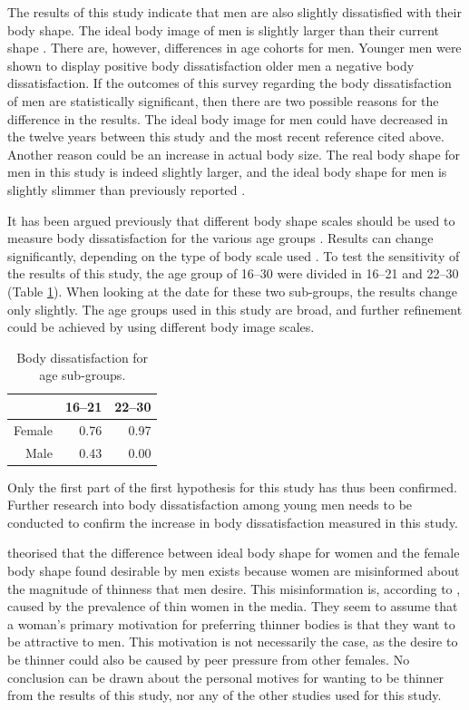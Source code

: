 \documentclass[a4paper, jou]{apa6}
\begin{document}
The results of this study indicate that men are also slightly dissatisfied with their body shape. The ideal body image of men is slightly larger than their current shape \cite{fallon_sex_1985,tiggeman_body-size_1992}. There are, however, differences in age cohorts for men. Younger men were shown to display positive body dissatisfaction older men a negative body dissatisfaction. If the outcomes of this survey regarding the body dissatisfaction of men are statistically significant, then there are two possible reasons for the difference in the results. The ideal body image for men could have decreased in the twelve years between this study and the most recent reference cited above. Another reason could be an increase in actual body size. The real body shape for men in this study is indeed slightly larger, and the ideal body shape for men is slightly slimmer than previously reported \cite{lamb_body_1993}.

It has been argued previously that different body shape scales should be used to measure body dissatisfaction for the various age groups \cite{byrne_should_1996}. Results can change significantly, depending on the type of body scale used \cite{tiggeman_body-size_1992}. To test the sensitivity of the results of this study, the age group of 16--30 were divided in 16--21 and 22--30 (Table \ref{age2}). When looking at the date for these two sub-groups, the results change only slightly. The age groups used in this study are broad, and further refinement could be achieved by using different body image scales.


\begin{table}[ht]
\centering
\begin{tabular}{rrr}
  \hline
 & 16--21 & 22--30 \\ 
  \hline
Female & 0.76 & 0.97 \\ 
  Male & 0.43 & 0.00 \\ 
   \hline
\end{tabular}
\caption{Body dissatisfaction for age sub-groups.} 
\label{age2}
\end{table}

Only the first part of the first hypothesis for this study has thus been confirmed. Further research into body dissatisfaction among young men needs to be conducted to confirm the increase in body dissatisfaction measured in this study.

 theorised that the difference between ideal body shape for women and the female body shape found desirable by men exists because women are misinformed about the magnitude of thinness that men desire. This misinformation is, according to , caused by the prevalence of thin women in the media. They seem to assume that a woman's primary motivation for preferring thinner bodies is that they want to be attractive to men. This motivation is not necessarily the case, as the desire to be thinner could also be caused by peer pressure from other females. No conclusion can be drawn about the personal motives for wanting to be thinner from the results of this study, nor any of the other studies used for this study.
\end{document}
